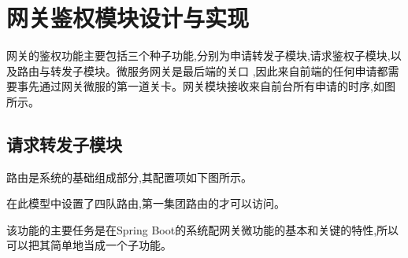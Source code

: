 \section{网关鉴权模块设计与实现}


网关的鉴权功能主要包括三个种子功能,分别为申请转发子模块,请求鉴权子模块,以及路由与转发子模块。微服务网关是最后端的关口
,因此来自前端的任何申请都需要事先通过网关微服的第一道关卡。网关模块接收来自前台所有申请的时序,如图所示。

\subsection{请求转发子模块}




路由是系统的基础组成部分,其配置项如下图所示。

在此模型中设置了四队路由,第一集团路由的才可以访问。

该功能的主要任务是在Spring Boot的系统配网关微功能的基本和关键的特性,所以可以把其简单地当成一个子功能。

